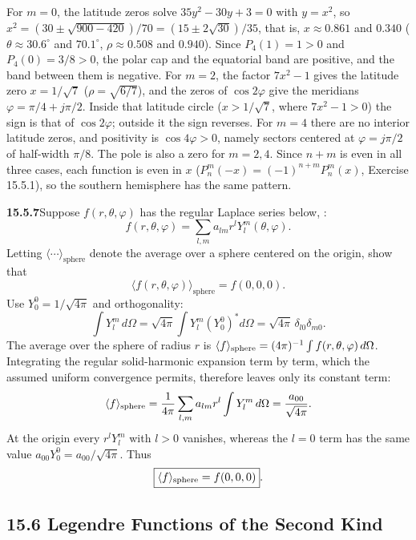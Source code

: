 For $m=0$, the latitude zeros solve $35y^2-30y+3=0$ with $y=x^2$, so
$x^2=(30\pm\sqrt{900-420})/70=(15\pm2\sqrt{30})/35$, that is,
$x\approx0.861$ and $0.340$ ($\theta\approx30.6^\circ$ and
$70.1^\circ$, $\rho\approx0.508$ and $0.940$). Since $P_4(1)=1>0$ and
$P_4(0)=3/8>0$, the polar cap and the equatorial band
are positive, and the band between them is negative.
For $m=2$, the factor $7x^2-1$ gives the latitude zero $x=1/\sqrt7$
($\rho=\sqrt{6/7}$), and the zeros of $\cos2\varphi$ give the
meridians $\varphi=\pi/4+j\pi/2$. Inside that latitude
circle ($x>1/\sqrt7$, where $7x^2-1>0$) the sign is that of
$\cos2\varphi$; outside it the sign reverses.
For $m=4$ there are no interior latitude zeros, and positivity is
$\cos4\varphi>0$, namely sectors centered at $\varphi=j\pi/2$
of half-width $\pi/8$. The pole is also a zero for $m=2,4$.
Since $n+m$ is even in all three cases, each function is even in $x$
($P_n^m(-x)=(-1)^{n+m}P_n^m(x)$, Exercise 15.5.1), so the southern
hemisphere has the same pattern.

\par\bigskip
\noindent\textbf{15.5.7}\quad Suppose $f(r,\theta,\varphi)$ has the regular Laplace
series below, :
\[
f(r,\theta,\varphi)=\sum_{l,m}a_{lm}r^{l}Y_{l}^{m}(\theta,\varphi).
\]
Letting $\langle\cdots\rangle_{\mathrm{sphere}}$ denote the average
over a sphere centered on the origin, show that
\[
\big\langle f(r,\theta,\varphi)\big\rangle_{\mathrm{sphere}}=f(0,0,0).
\]
\solution
Use $Y_0^0=1/\sqrt{4\pi}$ and orthogonality:
\[
\int Y_l^m\,d\Omega
=\sqrt{4\pi}\int Y_l^m(Y_0^0)^*d\Omega
=\sqrt{4\pi}\,\delta_{l0}\delta_{m0}.
\]
The average over the sphere of radius $r$ is
$\langle f\rangle_{\rm sphere}=(4\pi)^{-1}\int f(r,\theta,\varphi)\,d\Omega$.
Integrating the regular solid-harmonic expansion term by term, which the
assumed uniform convergence permits, therefore leaves only its constant
term:
\[
\langle f\rangle_{\rm sphere}
=\frac1{4\pi}\sum_{l,m}a_{lm}r^l\int Y_l^m\,d\Omega
=\frac{a_{00}}{\sqrt{4\pi}}.
\]
At the origin every $r^lY_l^m$ with $l>0$ vanishes, whereas
the $l=0$ term has the same value $a_{00}Y_0^0=a_{00}/\sqrt{4\pi}$.
Thus
\[
\boxed{\langle f\rangle_{\rm sphere}=f(0,0,0)}.
\]

\subsection*{15.6 Legendre Functions of the Second Kind}


